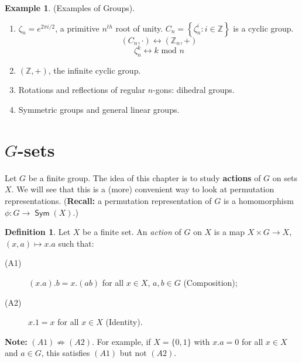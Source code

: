 \documentclass[12pt]{amsart}
\theoremstyle{definition}
\newtheorem{example}[theorem]{Example}
\newtheorem{definition}[theorem]{Definition}
\DeclareMathOperator{\Sym}{\mathsf{Sym}}
\begin{document}
\begin{example}(Examples of Groups).
\begin{enumerate}
\item $\zeta_{n} = e^{2 \pi i / 2}$, a primitive $n^{th}$ root of unity.
$C_{n} = \left\{ \zeta_{n}^{i} : i \in \mathbb{Z} \right\}$ is a cyclic group.
$$\left( C_{n}, \cdot \right) \longleftrightarrow \left( \mathbb{Z}_{n}, + \right)$$
$$\zeta_{n}^{k} \longleftrightarrow k \text{ mod } n$$
\item$\left( \mathbb{Z}, + \right)$, the infinite cyclic group.
\item Rotations and reflections of regular $n$-gons: dihedral groups.
\item Symmetric groups and general linear groups.
\end{enumerate}
\end{example}

\section{$G$-sets}
\label{sec:G-sets}
Let $G$ be a finite group.  The idea of this chapter is to study \textbf{actions} of $G$ on sets $X$.  We will see that this is a (more) convenient way to look at permutation representations.  (\textbf{Recall:} a permutation representation of $G$ is a homomorphism $\phi:G\rightarrow \Sym(X)$.)

\begin{definition}
Let $X$ be a finite set.  An \emph{action} of $G$ on $X$ is a map $X\times G\rightarrow X$, $(x, a)\mapsto x.a$ such that:
\begin{description}
\item[(A1)] $(x.a).b=x.(ab)$ for all $x\in X$, $a, b\in G$ (Composition);
\item[(A2)] $x.1=x$ for all $x\in X$ (Identity).
\end{description}
\end{definition}

\textbf{Note:} $(A1)\nRightarrow(A2).$  For example, if $X=\{0, 1\}$ with $x.a=0$ for all $x\in X$ and $a\in G$, this satisfies $(A1)$ but not $(A2)$.
\end{document}
